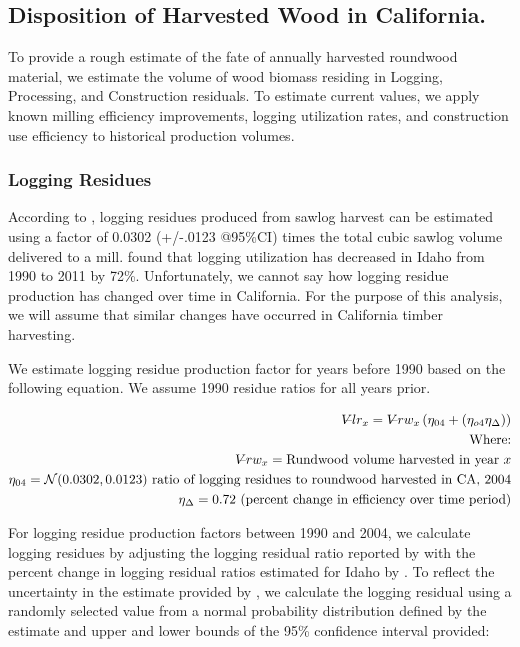 \documentclass[a4paper]{article}
\begin{document}
\subsection{Disposition of Harvested Wood in California.}
\label{sec:orgheadline13}
To provide a rough estimate of the fate of annually harvested roundwood material, we estimate the volume of wood biomass residing in Logging, Processing, and Construction 
residuals. To estimate current values, we apply known milling efficiency 
improvements, logging utilization rates, and construction use efficiency to historical production volumes. 
\subsubsection{Logging Residues}
\label{sec:orgheadline8}
According to \citet{Morgan}, logging residues produced from sawlog harvest can be estimated using a factor of 0.0302 (+/-.0123 @95\%CI) times the total cubic sawlog volume delivered to a mill. \citet{Simmons2014} found that logging utilization has decreased in Idaho from 1990 to 2011 by 72\%. Unfortunately, we cannot say how logging residue production has changed over time in California. For the purpose of this analysis, we will assume that similar changes have occurred in California timber harvesting. 

We estimate logging residue production factor for years before 1990 based on the following equation. We assume 1990 residue ratios for all years prior.


\begin{align*}
V\llap{--}lr_{x} = V\llap{--}rw_{x}\left(\eta_{04}+\left(\eta_{o4}\eta_\Delta\right)\right)\\
\text{Where:}\\
V\llap{--}rw_{x} = \text{Rundwood volume harvested in year }x\\
\eta_{04} = \mathcal{N}(0.0302,0.0123) \text{ ratio of logging residues to roundwood harvested in CA, 2004}\\
\eta_\Delta = 0.72 \text{ (percent change in efficiency over time period)}\\
\end{align*}

For logging residue production factors between 1990 and 2004, we calculate logging residues by adjusting the logging residual ratio reported by \citet{Morgan} with the percent change in logging residual ratios estimated for Idaho by \citet{Simmons2014}. To reflect the uncertainty in the estimate provided by \citet{Morgan}, we calculate the logging residual using a randomly selected value from a normal probability distribution defined by the estimate and upper and lower bounds of the 95\% confidence interval provided:
\end{document}
